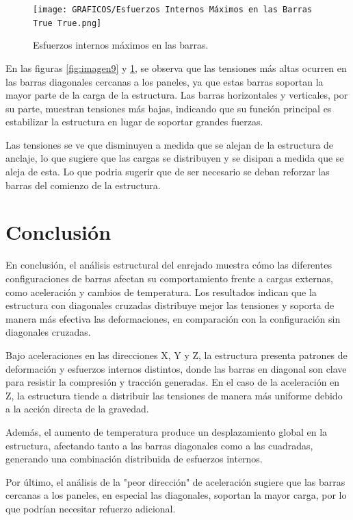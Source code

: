 \begin{figure}[H]
    \centering
    \texttt{[image: GRAFICOS/Esfuerzos Internos Máximos en las Barras True True.png]}
    \caption{Esfuerzos internos máximos en las barras.}
    \label{fig:imagen99}
\end{figure}

En las figuras \ref{fig:imagen9} y \ref{fig:imagen99}, se observa que las tensiones más altas ocurren en las barras diagonales cercanas a los paneles, ya que estas barras soportan la mayor parte de la carga de la estructura. Las barras horizontales y verticales, por su parte, muestran tensiones más bajas, indicando que su función principal es estabilizar la estructura en lugar de soportar grandes fuerzas.

Las tensiones se ve que disminuyen a medida que se alejan de la estructura de anclaje, lo que sugiere que las cargas se distribuyen y se disipan a medida que se aleja de esta. Lo que podria sugerir que de ser necesario se deban reforzar las barras del comienzo de la estructura.
\newpage
\section{Conclusión}

En conclusión, el análisis estructural del enrejado muestra cómo las diferentes configuraciones de barras afectan su comportamiento frente a cargas externas, como aceleración y cambios de temperatura. Los resultados indican que la estructura con diagonales cruzadas distribuye mejor las tensiones y soporta de manera más efectiva las deformaciones, en comparación con la configuración sin diagonales cruzadas.

Bajo aceleraciones en las direcciones X, Y y Z, la estructura presenta patrones de deformación y esfuerzos internos distintos, donde las barras en diagonal son clave para resistir la compresión y tracción generadas. En el caso de la aceleración en Z, la estructura tiende a distribuir las tensiones de manera más uniforme debido a la acción directa de la gravedad.

Además, el aumento de temperatura produce un desplazamiento global en la estructura, afectando tanto a las barras diagonales como a las cuadradas, generando una combinación distribuida de esfuerzos internos.

Por último, el análisis de la "peor dirección" de aceleración sugiere que las barras cercanas a los paneles, en especial las diagonales, soportan la mayor carga, por lo que podrían necesitar refuerzo adicional. 